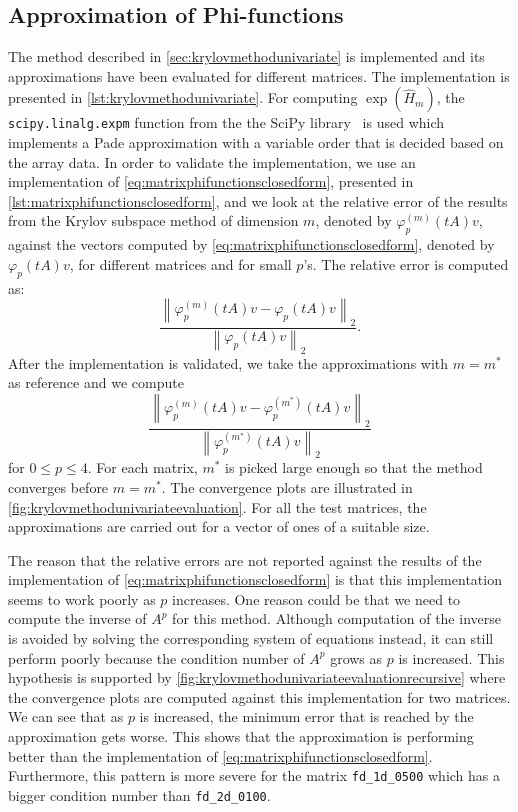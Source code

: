 \subsection{Approximation of Phi-functions}
The method described in \autoref{sec:krylovmethodunivariate} is implemented and its approximations have been evaluated
for different matrices. The implementation is presented in \autoref{lst:krylovmethodunivariate}.
For computing $\exp(\hat{H}_m)$, the \texttt{scipy.linalg.expm} function from the the SciPy library~\cite{SciPy2020}
is used which implements a Pade approximation with a variable order that is decided based on the array data.
In order to validate the implementation, we use an implementation of \eqref{eq:matrixphifunctionsclosedform}, presented in
\autoref{lst:matrixphifunctionsclosedform}, and we look at the relative error of the results from the Krylov subspace
method of dimension $m$, denoted by $\varphi_p^{(m)}(tA)v$, against the vectors computed by \eqref{eq:matrixphifunctionsclosedform},
denoted by $\varphi_p(tA)v$, for different matrices and for small $p$'s. The relative error is computed as:
\begin{equation*}
    \frac{\left\| \varphi_p^{(m)}(tA)v - \varphi_p(tA)v \right\|_2}{\left\| \varphi_p(tA)v\right\|_2}.
\end{equation*}
After the implementation is validated, we take the approximations with $m=m^*$ as reference and we compute
\begin{equation*}
    \frac{\left\| \varphi_p^{(m)}(tA)v - \varphi_p^{(m^*)}(tA)v \right\|_2}{\left\| \varphi_p^{(m^*)}(tA)v\right\|_2}
\end{equation*}
for $0 \le p \le 4$. For each matrix, $m^*$ is picked large enough so that the method converges before $m=m^*$.
The convergence plots are illustrated in \autoref{fig:krylovmethodunivariateevaluation}.
For all the test matrices, the approximations are carried out for a vector of ones of a suitable size.

\begin{remark}
    The reason that the relative errors are not reported against the results of the implementation of
    \eqref{eq:matrixphifunctionsclosedform} is that this implementation seems to work poorly as $p$ increases.
    One reason could be that we need to compute the inverse of $A^p$ for this method. Although computation of the
    inverse is avoided by solving the corresponding system of equations instead, it can still perform poorly because
    the condition number of $A^p$ grows as $p$ is increased. This hypothesis is supported by
    \autoref{fig:krylovmethodunivariateevaluationrecursive} where the convergence plots are computed against this implementation
    for two matrices. We can see that as $p$ is increased, the minimum error that is reached by the approximation gets worse.
    This shows that the approximation is performing better than the implementation of \eqref{eq:matrixphifunctionsclosedform}.
    Furthermore, this pattern is more severe for the matrix \texttt{fd\_1d\_0500} which has a bigger condition number
    than \texttt{fd\_2d\_0100}.
\end{remark}

